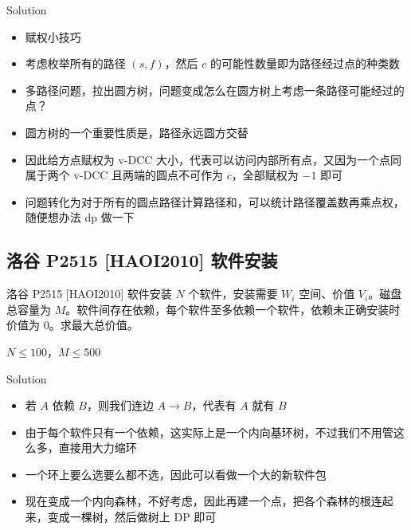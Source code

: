 ﻿\documentclass[aspectratio=169]{ctexbeamer}
\begin{document}
\begin{frame}{Solution}
    \begin{itemize}
        \item 赋权小技巧
        \item 考虑枚举所有的路径 $(s,f)$，然后 $c$ 的可能性数量即为路径经过点的种类数
        \item 多路径问题，拉出圆方树，问题变成怎么在圆方树上考虑一条路径可能经过的点？
        \item 圆方树的一个重要性质是，路径永远圆方交替
        \item 因此给方点赋权为 v-DCC 大小，代表可以访问内部所有点，又因为一个点同属于两个 v-DCC 且两端的圆点不可作为 $c$，全部赋权为 $-1$ 即可
        \item 问题转化为对于所有的圆点路径计算路径和，可以统计路径覆盖数再乘点权，随便想办法 dp 做一下
    \end{itemize}    
\end{frame}













\subsection{洛谷 P2515 [HAOI2010] 软件安装}

\begin{frame}{洛谷 P2515 [HAOI2010] 软件安装}
      $N$ 个软件，安装需要 $W_i$ 空间、价值 $V_i$。磁盘总容量为 $M$。软件间存在依赖，每个软件至多依赖一个软件，依赖未正确安装时价值为 $0$。求最大总价值。
      
      $N\le 100$，$M\le 500$
\end{frame}

\begin{frame}{Solution}
    \begin{itemize}
        \item 若 $A$ 依赖 $B$，则我们连边 $A\to B$，代表有 $A$ 就有 $B$
        \item 由于每个软件只有一个依赖，这实际上是一个内向基环树，不过我们不用管这么多，直接用大力缩环
        \item 一个环上要么选要么都不选，因此可以看做一个大的新软件包
        \item 现在变成一个内向森林，不好考虑，因此再建一个点，把各个森林的根连起来，变成一棵树，然后做树上 DP 即可
    \end{itemize}    
\end{frame}
\end{document}
